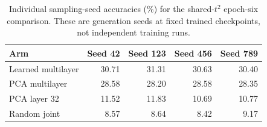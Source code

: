 \begin{table}[t]
\caption{Individual sampling-seed accuracies (\%) for the shared-$t^2$ epoch-six comparison. These are generation seeds at fixed trained checkpoints, not independent training runs.}
\label{tab:shared2seeds}
\centering\small
\setlength{\tabcolsep}{4pt}
\begin{tabular}{lrrrr}
\toprule
Arm & Seed 42 & Seed 123 & Seed 456 & Seed 789 \\
\midrule
Learned multilayer & 30.71 & 31.31 & 30.63 & 30.40 \\
PCA multilayer & 28.58 & 28.20 & 28.58 & 28.35 \\
PCA layer 32 & 11.52 & 11.83 & 10.69 & 10.77 \\
Random joint & 8.57 & 8.64 & 8.42 & 9.17 \\
\bottomrule
\end{tabular}
\end{table}

